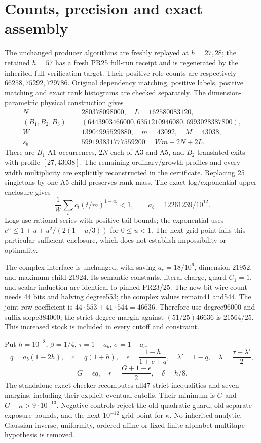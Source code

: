 \documentclass[11pt]{article}
\begin{document}
\section{Counts, precision and exact assembly}
The unchanged producer algorithms are freshly replayed at $h=27,28$; the retained $h=57$ has a fresh PR25 full-run receipt and is regenerated by the inherited full verification target. Their positive role counts are respectively $66258,75292,729786$. Original dependency matching, positive labels, positive matching and exact rank histograms are checked separately. The dimension-parametric physical construction gives
\[
\begin{split}
N&=280378098000,\quad L=162580083120,\\
(B_1,B_2,B_3)&=(6443903466000,6351210946080,6993028387800),\\
W&=13904995529880,\quad m=43092,\quad M=43038,\\
s_b&=599193831777559200= Wm-2N+2L.
\end{split}
\]
There are $B_1$ A1 occurrences, $2N$ each of A3 and A5, and $B_2$ translated exits with profile $[27,43038]$. The remaining ordinary/growth profiles and every width multiplicity are explicitly reconstructed in the certificate. Replacing 25 singletons by one A5 child preserves rank mass. The exact log/exponential upper enclosure gives
\[
\frac1W\sum_t c_t(t/m)^{1-a_b}<1,\qquad a_b=12261239/10^{12}.
\]
Logs use rational series with positive tail bounds; the exponential uses $e^u\leq1+u+u^2/(2(1-u/3))$ for $0\leq u<1$. The next grid point fails this particular sufficient enclosure, which does not establish impossibility or optimality.

The complex interface is unchanged, with saving $a_c=18/10^6$, dimension $21952$, and maximum child $21924$. Its semantic constants, literal charge, guard $C_1=1$, and scalar induction are identical to pinned PR23/25. The new bit wire count needs 44 bits and halving degree553; the complex values remain41 and544. The joint row coefficient is $44\cdot553+41\cdot544=46636$. Therefore use degree96000 and suffix slope384000; the strict degree margin against $(51/25)46636$ is $21564/25$. This increased stock is included in every cutoff and constraint.

Put $h=10^{-8}$, $\beta=1/4$, $\tau=1-a_b$, $\sigma=1-a_c$,
\[
q=a_b(1-2h),\quad c=q(1+h),\quad
\epsilon=\frac{1-h}{1+c+q},\quad
\lambda'=1-q,\quad \lambda=\frac{\tau+\lambda'}2,
\]
\[
G=\epsilon q,\quad r=\frac{G+1-\epsilon}{2},\quad\delta=h/8.
\]
The standalone exact checker recomputes all47 strict inequalities and seven margins, including their explicit eventual cutoffs. Their minimum is $G$ and $G-\kappa>9\cdot10^{-13}$. Negative controls reject the old quadratic guard, old separate exposure bounds, and the next $10^{-12}$ grid point for $\kappa$. No inherited analytic, Gaussian inverse, uniformity, ordered-affine or fixed finite-alphabet multitape hypothesis is removed.
\end{document}
